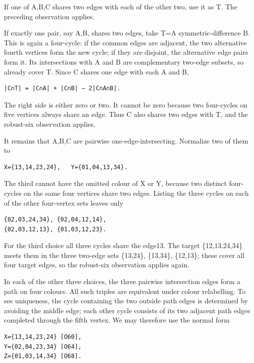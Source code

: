 \documentclass[
  10pt,
]{article}
\begin{document}
If one of A,B,C shares two edges with each of the other two, use it as
T. The preceding observation applies.

If exactly one pair, say A,B, shares two edges, take T=A
symmetric-difference B. This is again a four-cycle: if the common edges
are adjacent, the two alternative fourth vertices form the new cycle; if
they are disjoint, the alternative edge pairs form it. Its intersections
with A and B are complementary two-edge subsets, so already cover T.
Since C shares one edge with each A and B,

\begin{verbatim}
|C∩T| = |C∩A| + |C∩B| − 2|C∩A∩B|.
\end{verbatim}

The right side is either zero or two. It cannot be zero because two
four-cycles on five vertices always share an edge. Thus C also shares
two edges with T, and the robust-six observation applies.

It remains that A,B,C are pairwise one-edge-intersecting. Normalize two
of them to

\begin{verbatim}
X={13,14,23,24},   Y={01,04,13,34}.
\end{verbatim}

The third cannot have the omitted colour of X or Y, because two distinct
four-cycles on the same four vertices share two edges. Listing the three
cycles on each of the other four-vertex sets leaves only

\begin{verbatim}
{02,03,24,34}, {02,04,12,14},
{02,03,12,13}, {01,03,12,23}.
\end{verbatim}

For the third choice all three cycles share the edge13. The target
\{12,13,24,34\} meets them in the three two-edge sets \{13,24\},
\{13,34\}, \{12,13\}; these cover all four target edges, so the
robust-six observation applies again.

In each of the other three choices, the three pairwise intersection
edges form a path on four colours. All such triples are equivalent under
colour relabelling. To see uniqueness, the cycle containing the two
outside path edges is determined by avoiding the middle edge; each other
cycle consists of its two adjacent path edges completed through the
fifth vertex. We may therefore use the normal form

\begin{verbatim}
X={13,14,23,24} [O60],
Y={02,04,23,34} [O64],
Z={01,03,14,34} [O68].
\end{verbatim}
\end{document}
